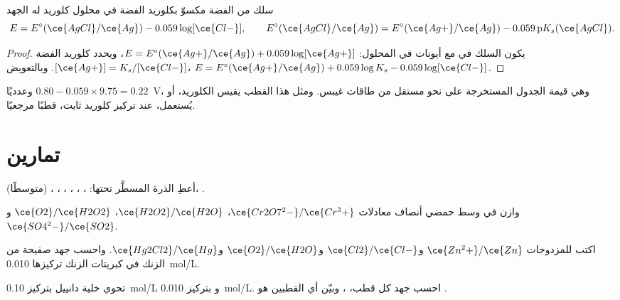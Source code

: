 \begin{proposition}\label{prop:b1:nernst:second-kind}
سلك من الفضة مكسوّ بكلوريد الفضة في محلول كلوريد له
الجهد
\[
  E = E^\circ(\ce{AgCl}/\ce{Ag}) - 0.059\log[\ce{Cl-}], \qquad
  E^\circ(\ce{AgCl}/\ce{Ag}) = E^\circ(\ce{Ag+}/\ce{Ag}) - 0.059\,\mathrm{p}K_s(\ce{AgCl}) .
\]
\end{proposition}

\begin{proof}
يكون السلك في  مع أيونات  في المحلول:
$E = E^\circ(\ce{Ag+}/\ce{Ag}) + 0.059\log[\ce{Ag+}]$، ويحدد كلوريد الفضة
$[\ce{Ag+}] = K_s/[\ce{Cl-}]$. وبالتعويض،
$E = E^\circ(\ce{Ag+}/\ce{Ag}) + 0.059\log K_s - 0.059\log[\ce{Cl-}]$.
\end{proof}

وعدديًا $0.80 - 0.059 \times 9.75 = 0.22$~V، وهي قيمة الجدول
المستخرجة على نحو مستقل من طاقات غيبس. ومثل هذا القطب
يقيس الكلوريد، أو يُستعمل، عند تركيز كلوريد ثابت، قطبًا مرجعيًا.

\section{تمارين}

\begin{exercise}[$\star$]\label{exo:b1:nernst:1}
أعطِ  الذرة المسطَّر تحتها: ،
، ، ،
، ، 
(متوسطًا)، .
\end{exercise}

\begin{exercise}[$\star$]\label{exo:b1:nernst:2}
وازن في وسط حمضي أنصاف معادلات $\ce{Cr2O7^2-}/\ce{Cr^3+}$،
$\ce{H2O2}/\ce{H2O}$، $\ce{O2}/\ce{H2O2}$ و$\ce{SO4^2-}/\ce{SO2}$.
\end{exercise}

\begin{exercise}[$\star$]\label{exo:b1:nernst:3}
اكتب  للمزدوجات $\ce{Zn^2+}/\ce{Zn}$ و$\ce{Cl2}/\ce{Cl-}$
و$\ce{O2}/\ce{H2O}$ و$\ce{Hg2Cl2}/\ce{Hg}$. واحسب جهد صفيحة من الزنك
في كبريتات الزنك تركيزها \qty{0.010}{mol/L}.
\end{exercise}

\begin{exercise}[$\star$]\label{exo:b1:nernst:4}
تحوي خلية دانييل  بتركيز \qty{0.10}{mol/L} و بتركيز
\qty{0.010}{mol/L}. احسب جهد كل قطب، ، وبيّن أي القطبين هو .
\end{exercise}

